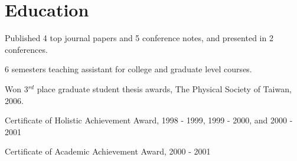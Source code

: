 \documentclass[letterpaper]{deedy-resume-openfont}
\begin{document}



\section{Education} 

\begin{tightemize}
\item Published 4 top journal papers and 5 conference notes, and presented in 2 conferences.
\item 6 semesters teaching assistant for college and graduate level courses.
\end{tightemize}
\sectionsep

\begin{tightemize}
\item Won 3$^{rd}$ place graduate student thesis awards, The Physical Society of Taiwan, 2006.
\end{tightemize}
\sectionsep

\begin{tightemize}
\item Certificate of Holistic Achievement Award, 1998 - 1999, 1999 - 2000, and 2000 - 2001
\item Certificate of Academic Achievement Award, 2000 - 2001
\end{tightemize}
\sectionsep
\end{document}
